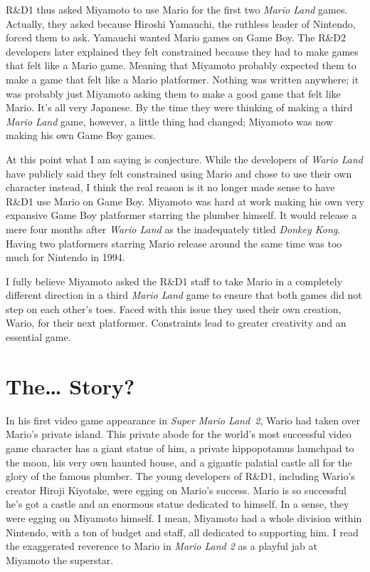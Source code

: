 \documentclass{book}
\begin{document}
R\&D1 thus asked Miyamoto to use Mario for the first two \emph{Mario Land} games. Actually, they asked because Hiroshi Yamauchi, the ruthless leader of Nintendo, forced them to ask. Yamauchi wanted Mario games on Game Boy. The R\&D2 developers later explained they felt constrained because they had to make games that felt like a Mario game. Meaning that Miyamoto probably expected them to make a game that felt like a Mario platformer. Nothing was written anywhere; it was probably just Miyamoto asking them to make a good game that felt like Mario. It’s all very Japanese. By the time they were thinking of making a third \emph{Mario Land} game, however, a little thing had changed; Miyamoto was now making his own Game Boy games.

At this point what I am saying is conjecture. While the developers of \emph{Wario Land} have publicly said they felt constrained using Mario and chose to use their own character instead, I think the real reason is it no longer made sense to have R\&D1 use Mario on Game Boy. Miyamoto was hard at work making his own very expansive Game Boy platformer starring the plumber himself. It would release a mere four months after \emph{Wario Land} as the inadequately titled \emph{Donkey Kong}. Having two platformers starring Mario release around the same time was too much for Nintendo in 1994.

I fully believe Miyamoto asked the R\&D1 staff to take Mario in a completely different direction in a third \emph{Mario Land} game to ensure that both games did not step on each other’s toes. Faced with this issue they used their own creation, Wario, for their next platformer. Constraints lead to greater creativity and an essential game.

\FloatBarrier\needspace{10mm}\section*{The… Story?}\nopagebreak[4]

In his first video game appearance in \emph{Super Mario Land 2}, Wario had taken over Mario’s private island. This private abode for the world’s most successful video game character has a giant statue of him, a private hippopotamus launchpad to the moon, his very own haunted house, and a gigantic palatial castle all for the glory of the famous plumber. The young developers of R\&D1, including Wario’s creator Hiroji Kiyotake, were egging on Mario’s success. Mario is so successful he’s got a castle and an enormous statue dedicated to himself. In a sense, they were egging on Miyamoto himself. I mean, Miyamoto had a whole division within Nintendo, with a ton of budget and staff, all dedicated to supporting him. I read the exaggerated reverence to Mario in \emph{Mario Land 2} as a playful jab at Miyamoto the superstar.
\end{document}
